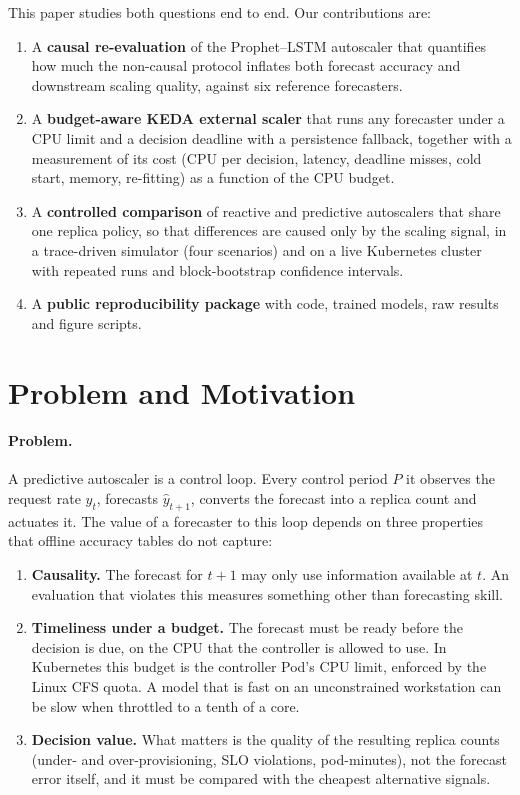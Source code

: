 \documentclass[conference,a4paper]{IEEEtran}
\begin{document}
This paper studies both questions end to end. Our contributions are:
\begin{enumerate}[label=C\arabic*]
\item A \textbf{causal re-evaluation} of the Prophet--LSTM autoscaler that quantifies how much the non-causal
      protocol inflates both forecast accuracy and downstream scaling quality, against six reference forecasters.
\item A \textbf{budget-aware KEDA external scaler} that runs any forecaster under a CPU limit and a decision
      deadline with a persistence fallback, together with a measurement of its cost (CPU per decision, latency,
      deadline misses, cold start, memory, re-fitting) as a function of the CPU budget.
\item A \textbf{controlled comparison} of reactive and predictive autoscalers that share one replica policy, so
      that differences are caused only by the scaling signal, in a trace-driven simulator (four scenarios) and on a
      live Kubernetes cluster with repeated runs and block-bootstrap confidence intervals.
\item A \textbf{public reproducibility package} with code, trained models, raw results and figure scripts.
\end{enumerate}


\section{Problem and Motivation}\label{sec:problem}
\paragraph{Problem.} A predictive autoscaler is a control loop. Every control period $P$ it observes the request
rate $y_t$, forecasts $\hat y_{t+1}$, converts the forecast into a replica count and actuates it. The value of a
forecaster to this loop depends on three properties that offline accuracy tables do not capture:
\begin{enumerate}
\item \textbf{Causality.} The forecast for $t{+}1$ may only use information available at $t$. An evaluation that
      violates this measures something other than forecasting skill.
\item \textbf{Timeliness under a budget.} The forecast must be ready before the decision is due, on the CPU that
      the controller is allowed to use. In Kubernetes this budget is the controller Pod's CPU limit, enforced by
      the Linux CFS quota. A model that is fast on an unconstrained workstation can be slow when throttled to
      a tenth of a core.
\item \textbf{Decision value.} What matters is the quality of the resulting replica counts (under- and
      over-provisioning, SLO violations, pod-minutes), not the forecast error itself, and it must be compared
      with the cheapest alternative signals.
\end{enumerate}
\end{document}
